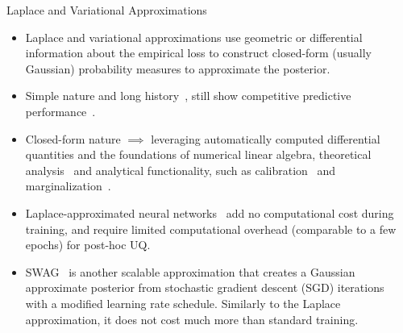 \documentclass[9pt]{beamer}
\begin{document}
\begin{frame}{Laplace and Variational Approximations}
\begin{itemize}[<+->]
	\item \alert{Laplace and variational approximations} use geometric or differential information about the empirical loss to construct closed-form (usually Gaussian) probability measures to approximate the posterior. 
	\item Simple nature and long history~\citep{mackay1992bayesian}, still show competitive predictive performance~\citep{daxberger2021a,rudner2022fsvi,antoran2023,rudner2023fseb}. 
	\item Closed-form nature $\implies$ leveraging automatically computed differential quantities and the foundations of numerical linear algebra, theoretical analysis~\citep{pmlr-v119-kristiadi20a} and analytical functionality, such as calibration~\citep{pmlr-v161-kristiadi21a,kristiadi2021infinite} and marginalization~\citep{khan2019approximate,immer2021scalable,pmlr-v130-immer21a}.
	\item \alert{Laplace-approximated neural networks}~\citep{ritter2018}  add no computational cost during training, and require limited computational overhead (comparable to a few epochs) for post-hoc UQ. %
	\item \alert{SWAG}~\citep{maddox2019simple} is another scalable approximation that creates a Gaussian approximate posterior from \alert{stochastic gradient descent (SGD)} iterations~\citep{mandt2017stochastic} with a modified learning rate schedule. Similarly to the Laplace approximation, it does not cost much more than standard training. 
\end{itemize}
\end{frame}
\end{document}
